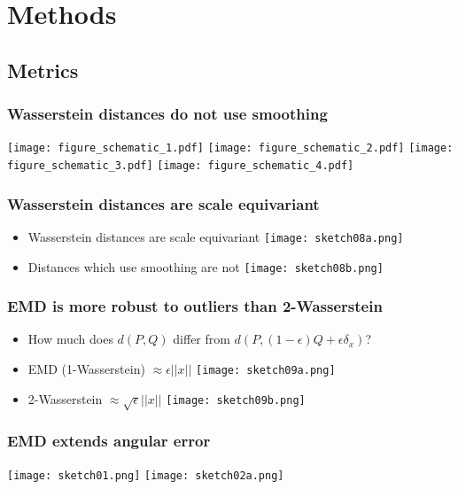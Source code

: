 \documentclass{beamer}
\begin{document}
\section{Methods}
\subsection{Metrics}
\begin{frame}
\frametitle{Wasserstein distances do not use smoothing}
\centering
\texttt{[image: figure\_schematic\_1.pdf]}
\texttt{[image: figure\_schematic\_2.pdf]}
\texttt{[image: figure\_schematic\_3.pdf]}
\texttt{[image: figure\_schematic\_4.pdf]}
\end{frame}



\begin{frame}
\frametitle{Wasserstein distances are scale equivariant}
\begin{itemize}
\item Wasserstein distances are scale equivariant
\texttt{[image: sketch08a.png]}
\item Distances which use smoothing are not
\texttt{[image: sketch08b.png]}
\end{itemize}
\end{frame}

\begin{frame}
\frametitle{EMD is more robust to outliers than 2-Wasserstein}
\begin{itemize}
\item How much does $d(P,Q)$ differ from $d(P,(1-\epsilon)Q + \epsilon \delta_x)$?
\item EMD (1-Wasserstein) $\approx \epsilon||x||$
\texttt{[image: sketch09a.png]}
\item 2-Wasserstein $\approx \sqrt{\epsilon}||x||$
\texttt{[image: sketch09b.png]}
\end{itemize}
\end{frame}

\begin{frame}
\frametitle{EMD extends angular error}
\begin{center}
\texttt{[image: sketch01.png]}
\texttt{[image: sketch02a.png]}
\end{center}
\end{frame}
\end{document}
